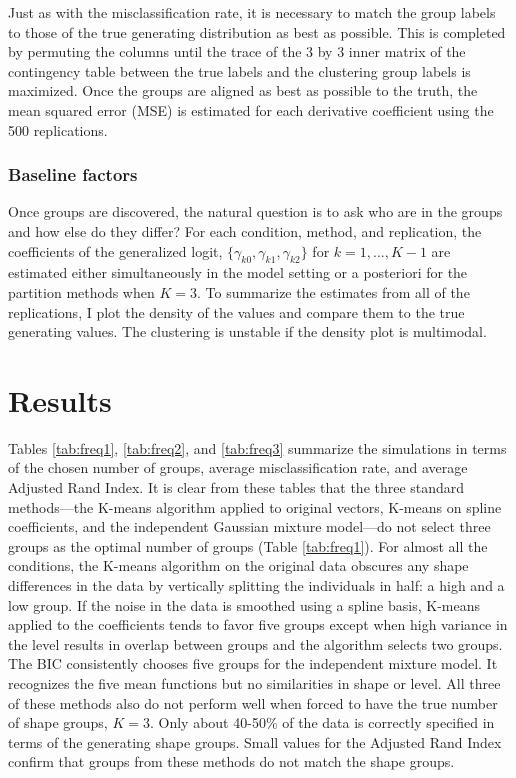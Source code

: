 Just as with the misclassification rate, it is necessary to match the group labels to those of the true generating distribution as best as possible. This is completed by permuting the columns until the trace of the 3 by 3 inner matrix of the contingency table between the true labels and the clustering group labels is maximized. Once the groups are aligned as best as possible to the truth, the mean squared error (MSE) is estimated for each derivative coefficient using the 500 replications.

\subsubsection{Baseline factors}
Once groups are discovered, the natural question is to ask who are in the groups and how else do they differ? For each condition, method, and replication, the coefficients of the generalized logit, $\{\gamma_{k0},\gamma_{k1},\gamma_{k2}\}$ for $k=1,...,K-1$ are estimated either simultaneously in the model setting or a posteriori for the partition methods when $K=3$. To summarize the estimates from all of the replications, I plot the density of the values and compare them to the true generating values. The clustering is unstable if the density plot is multimodal.

\section{Results}
Tables \ref{tab:freq1}, \ref{tab:freq2}, and \ref{tab:freq3} summarize the simulations in terms of the chosen number of groups, average misclassification rate, and average Adjusted Rand Index. It is clear from these tables that the three standard methods---the K-means algorithm applied to original vectors, K-means on spline coefficients, and the independent Gaussian mixture model---do not select three groups as the optimal number of groups (Table \ref{tab:freq1}). For almost all the conditions, the K-means algorithm on the original data obscures any shape differences in the data by vertically splitting the individuals in half: a high and a low group. If the noise in the data is smoothed using a spline basis, K-means applied to the coefficients tends to favor five groups except when high variance in the level results in overlap between groups and the algorithm selects two groups. The BIC consistently chooses five groups for the independent mixture model. It recognizes the five mean functions but no similarities in shape or level. All three of these methods also do not perform well when forced to have the true number of shape groups, $K=3$. Only about 40-50\% of the data is correctly specified in terms of the generating shape groups. Small values for the Adjusted Rand Index confirm that groups from these methods do not match the shape groups.


